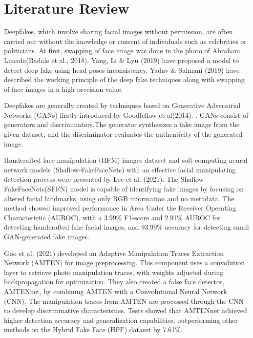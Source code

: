 \chapter{Literature Review}
Deepfakes, which involve sharing facial images without permission, are often carried out without the knowledge or consent of individuals such as celebrities or politicians. At first, swapping of face image was done in the photo of Abraham Lincoln(Badale et al., 2018)\cite{badale2018deep}. Yang, Li \& Lyu (2019)\cite{yang2019exposing} have proposed a model to detect deep fake using head poses inconsistency. Yadav \& Salmani (2019)\cite{yadav2019deepfake} have described the working principle of the deep fake techniques along with swapping of face images in a high precision value.

Deepfakes are generally created by techniques based on
Generative Adversarial Networks (GANs) firstly introduced
by Goodfellow et al(2014). \cite{goodfellow2014generative}. GANs consist of generators and discriminators.The generator synthesizes a fake image from the given dataset, and the discriminator evaluates the authenticity of the generated image.

Handcrafted face manipulation (HFM) images dataset and soft computing neural network models (Shallow-FakeFaceNets) with an effective facial manipulating detection process were presented by Lee et al. (2021)\cite{lee2021detecting}. The Shallow-FakeFaceNets(SFFN) model is capable of identifying fake images by focusing on altered facial landmarks, using only RGB information and no metadata. The method showed improved performance in Area Under the Receiver Operating Characteristic (AUROC), with a 3.99\% F1-score and 2.91\% AUROC for detecting handcrafted fake facial images, and 93.99\% accuracy for detecting small GAN-generated fake images.

Guo et al. (2021) \cite{guo2021fake} developed an Adaptive Manipulation Traces Extraction Network (AMTEN) for image preprocessing. This component uses a convolution layer to retrieve photo manipulation traces, with weights adjusted during backpropagation for optimization. They also created a false face detector, AMTENnet, by combining AMTEN with a Convolutional Neural Network (CNN). The manipulation traces from AMTEN are processed through the CNN to develop discriminative characteristics. Tests showed that AMTENnet achieved higher detection accuracy and generalization capabilities, outperforming other methods on the Hybrid Fake Face (HFF) dataset by 7.61\%.

